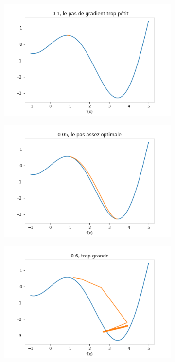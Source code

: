 \documentclass[a4paper,12pt]{article}
\begin{document}
\begin{figure}[h!]
\caption{La descente de gradiente de f(x) = x cos(x)}
\label{fig:tme3_descente}
\begin{subfigure}{.33\textwidth}
	\centering
	\includegraphics[width=\linewidth]{images/tme3/descente_0.png}
	\caption{}
\end{subfigure}%
\begin{subfigure}{.33\textwidth}
  \centering
	\includegraphics[width=\linewidth]{images/tme3/descente_1.png}
	\caption{}
\end{subfigure}
\begin{subfigure}{.33\textwidth}
  \centering
	\includegraphics[width=\linewidth]{images/tme3/descente_2.png}
	\caption{}
\end{subfigure}
\end{figure}
\end{document}
